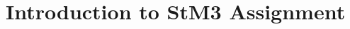 \documentclass[11pt,a4paper,oneside]{memoir}
\begin{document}


\chapter{Introduction to StM3 Assignment}\label{chap:intro}
\end{document}
